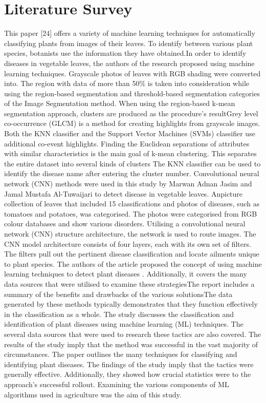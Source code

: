 \documentclass[a4paper,fleqn]{cas-sc}
\begin{document}
\section{Literature Survey}
This paper [24] offers a variety of machine learning techniques for automatically classifying plants from images of their leaves. To identify between various plant species, botanists use the information they have obtained.In order to identify diseases in vegetable leaves, the authors of the research \cite{trivedi2020plant, tulshan2019plant, panchal2019plant} proposed using machine learning techniques. Grayscale photos of leaves with RGB shading were converted into. The region with data of more than 50\% is taken into consideration while using the region-based segmentation and threshold-based segmentation categories of the Image Segmentation method. When using the region-based k-mean segmentation approach, clusters are produced as the procedure's resultGrey level co-occurrence (GLCM) is a method for creating highlights from grayscale images. Both the KNN classifier and the Support Vector Machines (SVMs) classifier use additional co-event highlights. Finding the Euclidean separations of attributes with similar characteristics is the main goal of k-mean clustering. This separates the entire dataset into several kinds of clusters The KNN classifier can be used to identify the disease name after entering the cluster number. Convolutional neural network (CNN) methods were used in this study \cite{jasim2020plant} by Marwan Adnan Jasim and Jamal Mustafa Al-Tuwaijari to detect disease in vegetable leaves.
           Anpicture collection of leaves that included 15 classifications and photos of diseases, such as tomatoes and potatoes, was categorised. The photos were categorised from RGB colour databases and show various disorders. Utilising a convolutional neural network (CNN) structure architecture, the network is used to route images. The CNN model architecture consists of four layers, each with its own set of filters. The filters pull out the pertinent disease classification and locate ailments unique to plant species. The authors of the article proposed the concept of using machine learning techniques to detect plant diseases \cite{varshney2021machine, rashmi2021machine}. Additionally, it covers the many data sources that were utilised to examine these strategiesThe report includes a summary of the benefits and drawbacks of the various solutionsThe data generated by these methods typically demonstrates that they function effectively in the classification as a whole. The study discusses the classification and identification of plant diseases using machine learning (ML) techniques. The several data sources that were used to research these tactics are also covered. The results of the study imply that the method was successful in the vast majority of circumstances. The paper outlines the many techniques for classifying and identifying plant diseases. The findings of the study imply that the tactics were generally effective. Additionally, they showed how crucial statistics were to the approach's successful rollout. Examining the various components of ML algorithms used in agriculture was the aim of this study.
\end{document}
